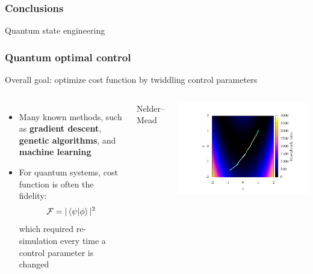 \documentclass{beamer}
\begin{document}
\begin{frame}
\frametitle{Conclusions}
\end{frame}

\begin{frame}
\center \huge Quantum state engineering
\end{frame}

\begin{frame}
\frametitle{Quantum optimal control}
Overall goal: optimize cost function by twiddling control parameters
\begin{columns}
\begin{itemize}
\pause
\item Many known methods, such as \textbf{gradient descent}, \textbf{genetic algorithms}, and \textbf{machine learning}
\pause
\item For quantum systems, cost function is often the fidelity:
$$
\mathcal{F}= |\braket{\psi|\phi}|^2
$$
which required re-simulation every time a control parameter is changed
\end{itemize}
\pause
{}
\begin{center}
Nelder--Mead
\end{center}
\includegraphics[width=\textwidth]{../data/1d/NM/NM.pdf}

\end{columns}
\end{frame}
\end{document}

